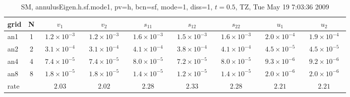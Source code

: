 \begin{table}[hbt]\tableFont %
\begin{center}
\begin{tabular}{|l|c|c|c|c|c|c|c|c|} \hline\hline 
grid  & N  & $v_1$ & $v_2$ & $s_{11}$ & $s_{12}$ & $s_{22}$ & $u_1$ & $u_2$\\ \hline 
                 an1 &     1 & ~$1.2\times10^{ -3}$~ & ~$1.2\times10^{ -3}$~ & ~$1.6\times10^{ -3}$~ & ~$1.5\times10^{ -3}$~ & ~$1.6\times10^{ -3}$~ & ~$2.0\times10^{ -4}$~ & ~$1.9\times10^{ -4}$~  \\ \hline
                 an2 &     2 & ~$3.1\times10^{ -4}$~ & ~$3.1\times10^{ -4}$~ & ~$4.1\times10^{ -4}$~ & ~$3.8\times10^{ -4}$~ & ~$4.1\times10^{ -4}$~ & ~$4.5\times10^{ -5}$~ & ~$4.5\times10^{ -5}$~  \\ \hline
                 an4 &     4 & ~$7.4\times10^{ -5}$~ & ~$7.4\times10^{ -5}$~ & ~$8.0\times10^{ -5}$~ & ~$7.2\times10^{ -5}$~ & ~$8.0\times10^{ -5}$~ & ~$9.3\times10^{ -6}$~ & ~$9.2\times10^{ -6}$~  \\ \hline
                 an8 &     8 & ~$1.8\times10^{ -5}$~ & ~$1.8\times10^{ -5}$~ & ~$1.4\times10^{ -5}$~ & ~$1.2\times10^{ -5}$~ & ~$1.4\times10^{ -5}$~ & ~$2.0\times10^{ -6}$~ & ~$2.0\times10^{ -6}$~  \\ \hline
    rate             &       &       $2.03$          &       $2.02$          &       $2.28$          &       $2.33$          &       $2.28$          &       $2.21$          &       $2.21$           \\ \hline\hline
\end{tabular}
\caption{SM, annulusEigen.h.sf.mode1, pv=h, bcn=sf, mode=1,  diss=1, $t=0.5$,  TZ, Tue May 19  7:03:36 2009}\label{table:annulusEigen.h.sf.mode1}
\end{center}
\end{table}
